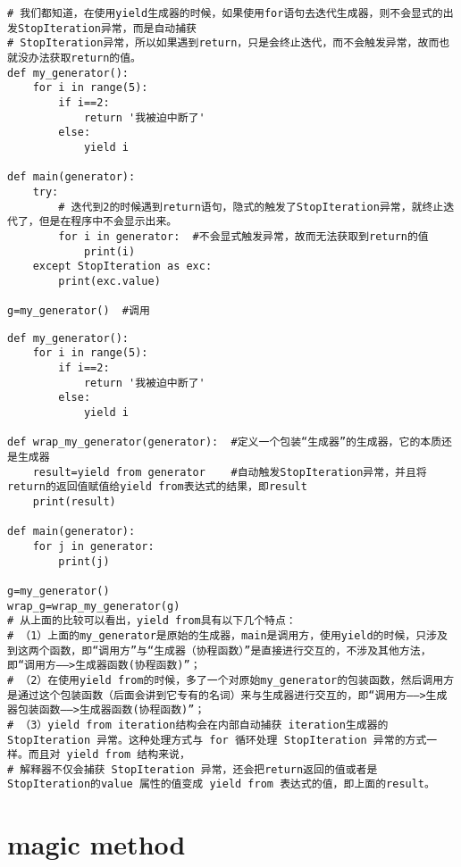 \documentclass[11pt]{article}
\begin{document}
\begin{verbatim}
# 我们都知道，在使用yield生成器的时候，如果使用for语句去迭代生成器，则不会显式的出发StopIteration异常，而是自动捕获
# StopIteration异常，所以如果遇到return，只是会终止迭代，而不会触发异常，故而也就没办法获取return的值。
def my_generator():
    for i in range(5):
        if i==2:
            return '我被迫中断了'
        else:
            yield i

def main(generator):
    try:
        # 迭代到2的时候遇到return语句，隐式的触发了StopIteration异常，就终止迭代了，但是在程序中不会显示出来。
        for i in generator:  #不会显式触发异常，故而无法获取到return的值
            print(i)
    except StopIteration as exc:
        print(exc.value)

g=my_generator()  #调用
\end{verbatim}
\begin{verbatim}
def my_generator():
    for i in range(5):
        if i==2:
            return '我被迫中断了'
        else:
            yield i

def wrap_my_generator(generator):  #定义一个包装“生成器”的生成器，它的本质还是生成器
    result=yield from generator    #自动触发StopIteration异常，并且将return的返回值赋值给yield from表达式的结果，即result
    print(result)

def main(generator):
    for j in generator:
        print(j)

g=my_generator()
wrap_g=wrap_my_generator(g)
# 从上面的比较可以看出，yield from具有以下几个特点：
# （1）上面的my_generator是原始的生成器，main是调用方，使用yield的时候，只涉及到这两个函数，即“调用方”与“生成器（协程函数）”是直接进行交互的，不涉及其他方法，即“调用方——>生成器函数(协程函数)”；
# （2）在使用yield from的时候，多了一个对原始my_generator的包装函数，然后调用方是通过这个包装函数（后面会讲到它专有的名词）来与生成器进行交互的，即“调用方——>生成器包装函数——>生成器函数(协程函数)”；
# （3）yield from iteration结构会在内部自动捕获 iteration生成器的StopIteration 异常。这种处理方式与 for 循环处理 StopIteration 异常的方式一样。而且对 yield from 结构来说，
# 解释器不仅会捕获 StopIteration 异常，还会把return返回的值或者是StopIteration的value 属性的值变成 yield from 表达式的值，即上面的result。
\end{verbatim}

\section{magic method}
\label{sec:orgcdce184}
\end{document}
